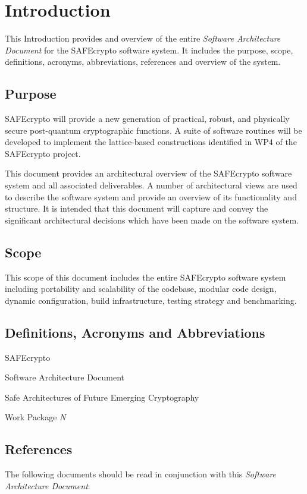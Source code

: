 \chapter{Introduction}
\label{ch_introduction}

This Introduction provides and overview of the entire \textit{Software Architecture Document} for the SAFEcrypto software system.
It includes the purpose, scope, definitions, acronyms, abbreviations, references and overview of the system.

\section{Purpose}
SAFEcrypto will provide a new generation of practical, robust, and physically secure post-quantum cryptographic functions. A suite of software routines will be developed to implement the lattice-based constructions identified in WP4 of the SAFEcrypto project.

This document provides an architectural overview of the SAFEcrypto software system and all associated deliverables. A number of architectural views are used to describe the software system and provide an overview of its functionality and structure. It is intended that this document will capture and convey the significant architectural decisions which have been made on the software system.

\section{Scope}
This scope of this document includes the entire SAFEcrypto software system including portability and scalability of the codebase, modular code design, dynamic configuration, build infrastructure, testing strategy and benchmarking.


\section{Definitions, Acronyms and Abbreviations}
\begin{labeling}{SAFEcrypto}
\item [SAD] Software Architecture Document
\item [SAFEcrypto] Safe Architectures of Future Emerging Cryptography
\item [WP\textit{N}] Work Package \textit{N}
\end{labeling}

\section{References}
The following documents should be read in conjunction with this \textit{Software Architecture Document}:

